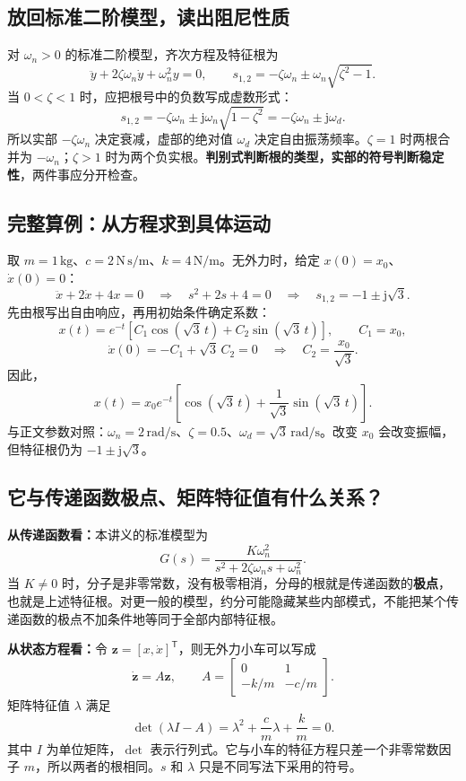 \documentclass[UTF8,a4paper,11pt,fontset=windows]{ctexart}
\newcommand{\unit}[1]{\,\mathrm{#1}}
\begin{document}
\subsection{放回标准二阶模型，读出阻尼性质}
对 $\omega_n>0$ 的标准二阶模型，齐次方程及特征根为
\[
  \ddot y+2\zeta\omega_n\dot y+\omega_n^2y=0,
  \qquad s_{1,2}=-\zeta\omega_n\pm\omega_n\sqrt{\zeta^2-1}.
\]
当 $0<\zeta<1$ 时，应把根号中的负数写成虚数形式：
\[
  \boxed{s_{1,2}=-\zeta\omega_n\pm\mathrm{j}\omega_n\sqrt{1-\zeta^2}
  =-\zeta\omega_n\pm\mathrm{j}\omega_d.}
\]
所以实部 $-\zeta\omega_n$ 决定衰减，虚部的绝对值 $\omega_d$ 决定自由振荡频率。$\zeta=1$ 时两根合并为 $-\omega_n$；$\zeta>1$ 时为两个负实根。\textbf{判别式判断根的类型，实部的符号判断稳定性}，两件事应分开检查。

\newpage
\subsection{完整算例：从方程求到具体运动}
取 $m=1\unit{kg}$、$c=2\unit{N\,s/m}$、$k=4\unit{N/m}$。无外力时，给定 $x(0)=x_0$、$\dot x(0)=0$：
\[
  \ddot x+2\dot x+4x=0
  \quad\Rightarrow\quad s^2+2s+4=0
  \quad\Rightarrow\quad s_{1,2}=-1\pm\mathrm{j}\sqrt3.
\]
先由根写出自由响应，再用初始条件确定系数：
\[
  x(t)=e^{-t}[C_1\cos(\sqrt3\,t)+C_2\sin(\sqrt3\,t)],
  \qquad C_1=x_0,
\]
\[
  \dot x(0)=-C_1+\sqrt3\,C_2=0
  \quad\Rightarrow\quad C_2=\frac{x_0}{\sqrt3}.
\]
因此，
\[
  \boxed{x(t)=x_0e^{-t}\left[\cos(\sqrt3\,t)+\frac{1}{\sqrt3}\sin(\sqrt3\,t)\right].}
\]
与正文参数对照：$\omega_n=2\unit{rad/s}$、$\zeta=0.5$、$\omega_d=\sqrt3\unit{rad/s}$。改变 $x_0$ 会改变振幅，但特征根仍为 $-1\pm\mathrm{j}\sqrt3$。

\subsection{它与传递函数极点、矩阵特征值有什么关系？}
\textbf{从传递函数看：}本讲义的标准模型为
\[
  G(s)=\frac{K\omega_n^2}{s^2+2\zeta\omega_ns+\omega_n^2}.
\]
当 $K\ne0$ 时，分子是非零常数，没有极零相消，分母的根就是传递函数的\textbf{极点}，也就是上述特征根。对更一般的模型，约分可能隐藏某些内部模式，不能把某个传递函数的极点不加条件地等同于全部内部特征根。

\textbf{从状态方程看：}令 $\boldsymbol z=[x,\dot x]^{\mathsf T}$，则无外力小车可以写成
\[
  \dot{\boldsymbol z}=A\boldsymbol z,\qquad
  A=\begin{bmatrix}0&1\\-k/m&-c/m\end{bmatrix}.
\]
矩阵特征值 $\lambda$ 满足
\[
  \det(\lambda I-A)=\lambda^2+\frac{c}{m}\lambda+\frac{k}{m}=0.
\]
其中 $I$ 为单位矩阵，$\det$ 表示行列式。它与小车的特征方程只差一个非零常数因子 $m$，所以两者的根相同。$s$ 和 $\lambda$ 只是不同写法下采用的符号。
\end{document}

